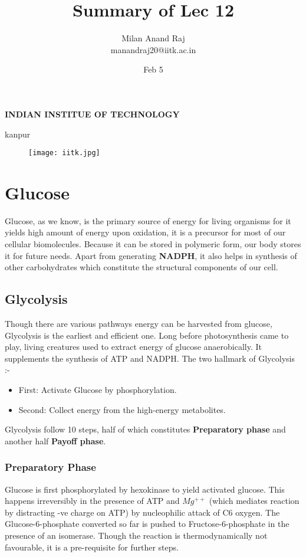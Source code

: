\documentclass[12pt]{article}
\title{Summary of Lec 12}
\author{Milan Anand Raj\\manandraj20@iitk.ac.in}
\date{Feb 5}
\begin{document}
\NoBgThispage
\maketitle



\begin{center}
\textbf{INDIAN INSTITUE OF TECHNOLOGY}

kanpur
\end{center}


\vfill
\begin{figure}
\centering
\texttt{[image: iitk.jpg]}
\end{figure}
\clearpage
\tableofcontents
\clearpage
\NoBgThispage
\section{Glucose}
Glucose, as we know, is the primary source of energy for living organisms for it yields high amount of energy upon oxidation, it is a precursor for most of our cellular biomolecules. Because it can be stored in polymeric form, our body stores it for future needs. Apart from generating \textbf{NADPH}, it also helps in synthesis of other carbohydrates which constitute the structural components of our cell.
\subsection{Glycolysis}
Though there are various pathways energy can be harvested from glucose, Glycolysis is the earliest and efficient one. Long before photosynthesis came to play, living creatures used to extract energy of glucose anaerobically. It supplements the synthesis of ATP and NADPH. The two hallmark of Glycolysis :-
\begin{itemize}
\item First: Activate Glucose by phosphorylation.
\item Second: Collect energy from the high-energy metabolites.
\end{itemize}

Glycolysis follow 10 steps, half of which constitutes \textbf{Preparatory phase} and another half \textbf{Payoff phase}.

\subsubsection{Preparatory Phase}
Glucose is first phosphorylated by hexokinase to yield activated glucose. This happens irreversibly in the presence of  ATP and $Mg^{++}$ (which mediates reaction by distracting -ve charge on ATP) by nucleophilic attack of C6 oxygen. The Glucose-6-phosphate converted so far is pushed to Fructose-6-phosphate in the presence of an isomerase. Though the reaction is thermodynamically not favourable, it is a pre-requisite for further steps.
\end{document}
